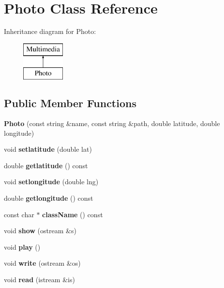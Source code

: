 \hypertarget{class_photo}{}\section{Photo Class Reference}
\label{class_photo}
Inheritance diagram for Photo\+:\begin{figure}[H]
\begin{center}
\leavevmode
\includegraphics[height=2.000000cm]{class_photo}
\end{center}
\end{figure}
\subsection*{Public Member Functions}
\begin{DoxyCompactItemize}
\item 
\mbox{\label{class_photo_a6e3fc5ee1b9820d272fa91d6ed964fde}} 
{\bfseries Photo} (const string \&name, const string \&path, double latitude, double longitude)
\item 
\mbox{\label{class_photo_afa447ebfde665b60ef99ee5596c43cef}} 
void {\bfseries setlatitude} (double lat)
\item 
\mbox{\label{class_photo_a3642747fb49916e3f06471fb0c863b58}} 
double {\bfseries getlatitude} () const
\item 
\mbox{\label{class_photo_a6dd26c27e51a28ca5ffb8101f9d6912d}} 
void {\bfseries setlongitude} (double lng)
\item 
\mbox{\label{class_photo_a98d2ad2d06c89f838024f2f68eeca65b}} 
double {\bfseries getlongitude} () const
\item 
\mbox{\label{class_photo_ad204e11d98df45dad1c2531d12a81215}} 
const char $\ast$ {\bfseries class\+Name} () const
\item 
\mbox{\label{class_photo_a5ec4e97cbfd70928befab6fe673fdf45}} 
void {\bfseries show} (ostream \&s)
\item 
\mbox{\label{class_photo_a145e0540284cbc678ef5bdb02a8fcaa8}} 
void {\bfseries play} ()
\item 
\mbox{\label{class_photo_ab96894358a8e9c5fdc9fbb082521363b}} 
void {\bfseries write} (ostream \&os)
\item 
\mbox{\label{class_photo_a1425e92c0fcedcbe5c7dec5d74cafc16}} 
void {\bfseries read} (istream \&is)
\end{DoxyCompactItemize}


